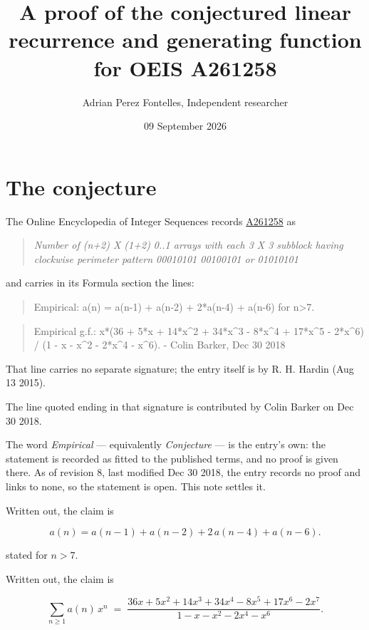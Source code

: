 \documentclass[11pt]{article}
\title{A proof of the conjectured linear recurrence and generating function for OEIS A261258}
\author{Adrian Perez Fontelles, Independent researcher}
\date{09 September 2026}
\theoremstyle{definition}
\begin{document}
\maketitle
\section{The conjecture}

The Online Encyclopedia of Integer Sequences records \href{https://oeis.org/A261258}{A261258} as

\begin{quote}\itshape Number of (n+2) X (1+2) 0..1 arrays with each 3 X 3 subblock having clockwise perimeter pattern 00010101 00100101 or 01010101\end{quote}

and carries in its Formula section the lines:

\begin{quote}\ttfamily Empirical: a(n) = a(n-1) + a(n-2) + 2*a(n-4) + a(n-6) for n>7.\end{quote}

\begin{quote}\ttfamily Empirical g.f.: x*(36 + 5*x + 14*x\textasciicircum{}2 + 34*x\textasciicircum{}3 - 8*x\textasciicircum{}4 + 17*x\textasciicircum{}5 - 2*x\textasciicircum{}6) / (1 - x - x\textasciicircum{}2 - 2*x\textasciicircum{}4 - x\textasciicircum{}6). - Colin Barker, Dec 30 2018\end{quote}

That line carries no separate signature; the entry itself is by R. H. Hardin (Aug 13 2015).

The line quoted ending in that signature is contributed by Colin Barker on Dec 30 2018.

The word {\itshape Empirical} --- equivalently {\itshape Conjecture} --- is the entry's own: the statement is recorded as fitted to the published terms, and no proof is given there. As of revision 8, last modified Dec 30 2018, the entry records no proof and links to none, so the statement is open. This note settles it.

Written out, the claim is

\[a(n) = a(n-1) + a(n-2) + 2\,a(n-4) + a(n-6).\]

stated for $n > 7$.

Written out, the claim is

\[\sum_{n \ge 1} a(n)\,x^n \;=\; \frac{36x + 5x^{2} + 14x^{3} + 34x^{4} - 8x^{5} + 17x^{6} - 2x^{7}}{1 - x - x^{2} - 2x^{4} - x^{6}}.\]
\end{document}
